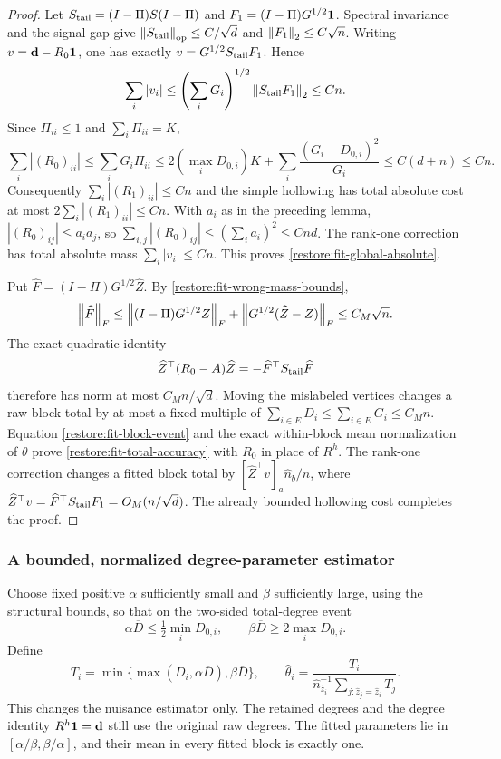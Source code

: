 \begin{proof}
Let $S_{\rm tail}=(I-\Pi)S(I-\Pi)$ and
$F_1=(I-\Pi)G^{1/2}\mathbf 1$. Spectral invariance and the signal gap give
$\left\lVert S_{\rm tail}\right\rVert_{\mathrm{op}}\le C/\sqrt d$ and
$\left\lVert F_1\right\rVert_2\le C\sqrt n$.
Writing $v=\mathbf d-R_0\mathbf 1$, one has exactly
$v=G^{1/2}S_{\rm tail}F_1$. Hence
\[
 \sum_i|v_i|
 \le\left(\sum_iG_i\right)^{1/2}
          \left\lVert S_{\rm tail}F_1\right\rVert_2\le Cn.
\]
Since $\Pi_{ii}\le1$ and $\sum_i\Pi_{ii}=K$,
\[
 \sum_i|(R_0)_{ii}|
 \le\sum_iG_i\Pi_{ii}
 \le2(\max_iD_{0,i})K
       +\sum_i\frac{(G_i-D_{0,i})^2}{G_i}
 \le C(d+n)\le Cn.
\]
Consequently $\sum_i|(R_1)_{ii}|\le Cn$ and the simple hollowing
has total absolute cost at most $2\sum_i|(R_1)_{ii}|\le Cn$.
With $a_i$ as in the preceding lemma,
$|(R_0)_{ij}|\le a_ia_j$, so
$\sum_{i,j}|(R_0)_{ij}|\le(\sum_i a_i)^2\le Cnd$.
The rank-one correction has total absolute mass $\sum_i|v_i|\le Cn$.
This proves \eqref{restore:fit-global-absolute}.

Put $\widehat F=(I-\Pi)G^{1/2}\widehat Z$. By
\eqref{restore:fit-wrong-mass-bounds},
\[
 \left\lVert\widehat F\right\rVert_F
 \le\left\lVert(I-\Pi)G^{1/2}Z\right\rVert_F
       +\left\lVert G^{1/2}(\widehat Z-Z)\right\rVert_F
 \le C_M\sqrt n .
\]
The exact quadratic identity
\[
 \widehat Z^\top(R_0-A)\widehat Z
       =-\widehat F^\top S_{\rm tail}\widehat F
\]
therefore has norm at most $C_Mn/\sqrt d$. Moving the mislabeled
vertices changes a raw block total by at most a fixed multiple of
$\sum_{i\in E}D_i\le\sum_{i\in E}G_i\le C_Mn$.
Equation \eqref{restore:fit-block-event} and the exact within-block
mean normalization of $\theta$ prove \eqref{restore:fit-total-accuracy}
with $R_0$ in place of $R^h$.
The rank-one correction changes a fitted block total by
$[\widehat Z^\top v]_a\widehat n_b/n$, where
$\widehat Z^\top v=\widehat F^\top S_{\rm tail}F_1=O_M(n/\sqrt d)$.
The already bounded hollowing cost completes the proof.
\end{proof}

\subsubsection{A bounded, normalized degree-parameter estimator}

Choose fixed positive $\alpha$ sufficiently small and $\beta$ sufficiently
large, using the structural bounds, so that on the two-sided
total-degree event
\[
 \alpha\overline D\le\tfrac12\min_iD_{0,i},\qquad
 \beta\overline D\ge2\max_iD_{0,i}.
\]
Define
\begin{equation}\label{restore:fit-clamped-theta}
 T_i=\min\{\max(D_i,\alpha\overline D),\beta\overline D\},
 \qquad
 \widehat\theta_i=
 \frac{T_i}{\widehat n_{\widehat z_i}^{-1}
                 \sum_{j:\widehat z_j=\widehat z_i}T_j}.
\end{equation}
This changes the nuisance estimator only. The retained degrees and the
degree identity $R^h\mathbf 1=\mathbf d$ still use the original raw degrees.
The fitted parameters lie in $[\alpha/\beta,\beta/\alpha]$, and their
mean in every fitted block is exactly one.

